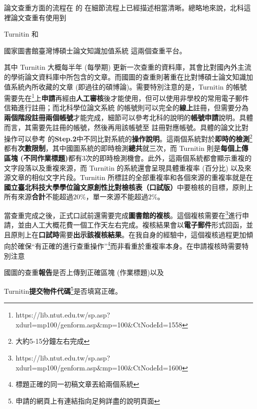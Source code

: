 \documentclass[12pt]{report}
\theoremstyle{plain}
\begin{document}
論文查重方面的流程在 \cite{ntutlibgraduate} 的 在細節流程上已經描述相當清晰。總略地來說，北科這裡論文查重有使用到
\begin{enumerate*}
    \item Turnitin \cite{turnitin} 和
    \item 國家圖書館臺灣博碩士論文知識加值系統 \cite{ntutlibupdate} 這兩個查重平台。
\end{enumerate*}
其中 Turnitin 大概每半年 (每學期) 更新一次查重的資料庫，其會比對國內外主流的學術論文資料庫中所包含的文章。而國圖的查重則著重在比對博碩士論文知識加值系統內所收藏的文章 (即過往的碩博論)。需要特別注意的是，Turnitin 的帳號需要先在\footnote{https://lib.ntut.edu.tw/sp.asp?xdurl=mp100/genform.asp\&mp=100\&CtNodeId=1558}上\textbf{申請}再經由\textbf{人工審核}後才能使用，但可以使用非學校的常用電子郵件信箱進行註冊；而北科學位論文系統 \cite{ntutlibupdate} 的帳號則可以完全的\textbf{線上}註冊，但需要分為\textbf{兩個階段註冊兩個帳號}才能完成，細節可以參考北科的說明\cite{ntutlibupdate}的\textbf{帳號申請}說明。具體而言，其需要先註冊\cite{ndltd}的帳號，然後再用該帳號至 \cite{ntut-ncl-reg} 註冊對應帳號。具體的論文比對操作可以參考\cite{ntutlibgraduate} 的\textbf{Step.2}中不同比對系統的\textbf{操作說明}。這兩個系統對於\textbf{即時的檢測}\footnote{大約5-15分鐘左右完成}都有\textbf{次數限制}，其中國圖系統的即時檢測\textbf{總共}就三次，而 Turnitin 則是\textbf{每個上傳區塊 (不同作業標題)}都有3次的即時檢測機會。此外，這兩個系統都會顯示重複的文字段落以及重複來源，而 Turnitin 的系統還會呈現具體重複率 (百分比) 以及來源文章的相似文字片段。Turnitin 所標註的全部重複率和各個來源的重複率就是在\textbf{國立臺北科技大學學位論文原創性比對檢核表{（口試版）}}中要檢核的目標，原則上所有來源\textbf{合計}不能超過$20\%$，單一來源不能超過$2\%$。

當查重完成之後，正式口試前還需要完成\textbf{圖書館的複核}。這個複核需要在\footnote{https://lib.ntut.edu.tw/sp.asp?xdurl=mp100/genform.asp\&mp=100\&CtNodeId=1600}進行申請，並由人工大概花費一個工作天左右完成。複核結果會以\textbf{電子郵件}形式回函，並且原則上在\textbf{口試時}需要\textbf{出示該複核結果}。在我自身的經驗中，這個複核過程更加傾向於確保``有正確的進行查重操作''\footnote{標題正確的同一初稿文章丟給兩個系統}而非看重於重複率本身。在申請複核時需要特別注意
\begin{enumerate*}
    \item 國圖的查重\textbf{報告}是否上傳到正確區塊 (作業標題)以及
    \item Turnitin\textbf{提交物件代碼}\footnote{申請的網頁上有連結指向足夠詳盡的說明頁面}是否填寫正確。
\end{enumerate*}
\end{document}
